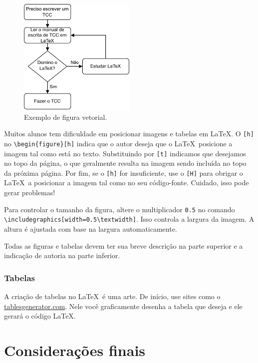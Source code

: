 \documentclass[
	article,			%
	12pt,				%
	oneside,			%
	a4paper,			%
	english,			%
	brazil,				%
	sumario=tradicional
]{abntex2}
\begin{document}
\begin{figure}[h]
	\centering
	\label{fig1}
	\caption{Exemplo de figura vetorial.}
	\includegraphics[width=0.5\textwidth]{figuras/diagrama-tcc-latex.pdf}
\end{figure}

Muitos alunos tem dificuldade em posicionar imagens e tabelas em \LaTeX. O \verb|[h]| no \verb|\begin{figure}[h]| indica que o autor deseja que o \LaTeX\ posicione a imagem tal como está no texto. Substituindo por \verb|[t]| indicamos que desejamos no topo da página, o que geralmente resulta na imagem sendo incluída no topo da próxima página. Por fim, se o \verb|[h]| for insuficiente, use o \verb|[H]| para obrigar o \LaTeX\ a posicionar a imagem tal como no seu código-fonte. Cuidado, isso pode gerar problemas!

Para controlar o tamanho da figura, altere o multiplicador \verb|0.5| no comando \verb|\includegraphics[width=0.5\textwidth]|. Isso controla a largura da imagem. A altura é ajustada com base na largura automaticamente.

Todas as figuras e tabelas devem ter sua breve descrição na parte superior e a indicação de autoria na parte inferior.

\subsubsection{Tabelas}

A criação de tabelas no \LaTeX\ é uma arte. De início, use sites como o \href{https://www.tablesgenerator.com/}{tablesgenerator.com}. Nele você graficamente desenha a tabela que deseja e ele gerará o código \LaTeX. 

\section{Considerações finais}
\end{document}
